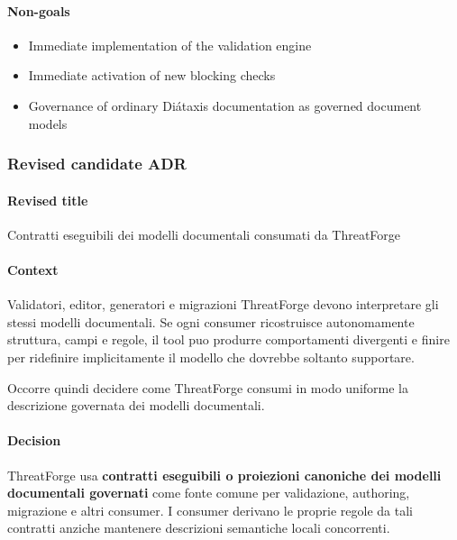 \documentclass[
  10pt,
]{article}
\providecommand{\tightlist}{%
  \setlength{\itemsep}{0pt}\setlength{\parskip}{0pt}}
\begin{document}
\paragraph{Non-goals}\label{non-goals-4}

\begin{itemize}
\tightlist
\item
  Immediate implementation of the validation engine
\item
  Immediate activation of new blocking checks
\item
  Governance of ordinary Diátaxis documentation as governed document
  models
\end{itemize}

\subsubsection{Revised candidate ADR}\label{revised-candidate-adr-5}

\paragraph{Revised title}\label{revised-title-5}

Contratti eseguibili dei modelli documentali consumati da ThreatForge

\paragraph{Context}\label{context-11}

Validatori, editor, generatori e migrazioni ThreatForge devono
interpretare gli stessi modelli documentali. Se ogni consumer
ricostruisce autonomamente struttura, campi e regole, il tool puo
produrre comportamenti divergenti e finire per ridefinire implicitamente
il modello che dovrebbe soltanto supportare.

Occorre quindi decidere come ThreatForge consumi in modo uniforme la
descrizione governata dei modelli documentali.

\paragraph{Decision}\label{decision-11}

ThreatForge usa \textbf{contratti eseguibili o proiezioni canoniche dei
modelli documentali governati} come fonte comune per validazione,
authoring, migrazione e altri consumer. I consumer derivano le proprie
regole da tali contratti anziche mantenere descrizioni semantiche locali
concorrenti.
\end{document}
